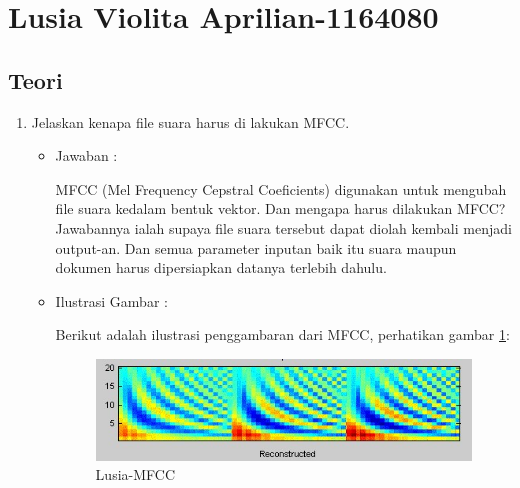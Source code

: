 \par
\par
\par
\par

\section{Lusia Violita Aprilian-1164080}

\subsection{Teori}

\begin{enumerate}
\item Jelaskan kenapa file suara harus di lakukan MFCC.
	\begin{itemize}
	\item Jawaban :
		\par MFCC (Mel Frequency Cepstral Coeficients) digunakan untuk mengubah file suara kedalam bentuk vektor. Dan mengapa harus dilakukan MFCC? Jawabannya ialah supaya file suara tersebut dapat diolah kembali menjadi output-an. Dan semua parameter inputan baik itu suara maupun dokumen harus dipersiapkan datanya terlebih dahulu. 
	\item Ilustrasi Gambar :
		\par Berikut adalah ilustrasi penggambaran dari MFCC, perhatikan gambar \ref{6A1}:
		\begin{figure}[!hbtp]
		\centering
		\includegraphics[scale=0.4]{figures/s1.jpg}
		\caption{Lusia-MFCC}
		\label{6A1}
		\end{figure}
	\end{itemize}
	

\end{enumerate}

